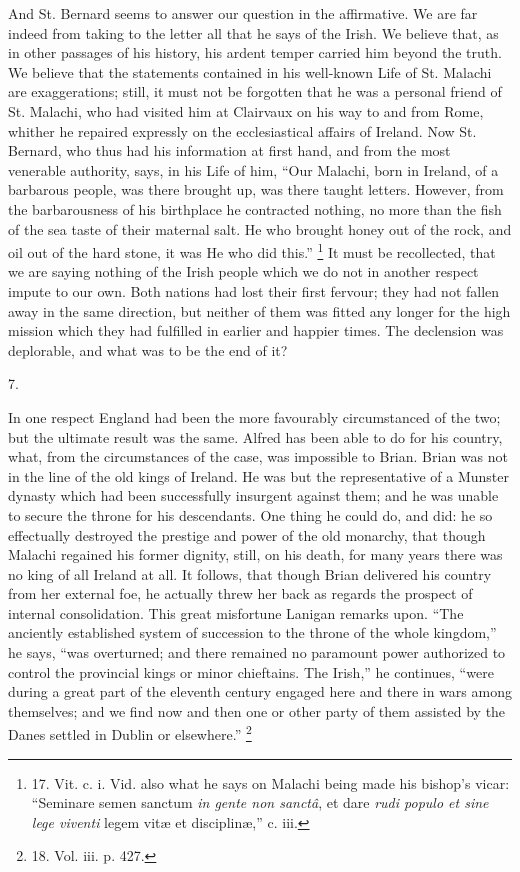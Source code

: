 And St. Bernard seems to
answer our question in the affirmative. We are far indeed from taking
to the letter all that he says of the Irish. We believe that, as in
other passages of his history, his ardent temper carried him beyond
the truth. We believe that the statements contained in his well-known
Life of St. Malachi are exaggerations; still, it must not be forgotten
that he was a personal friend of St. Malachi, who had visited him at
Clairvaux on his way to and from Rome, whither he repaired expressly
on the ecclesiastical affairs of Ireland. Now St. Bernard, who thus
had his information at first hand, and from the most venerable
authority, says, in his Life of him, ``Our Malachi, born in Ireland, of
a barbarous people, was there brought up, was there taught letters.
However, from the barbarousness of his birthplace he contracted
nothing, no more than the fish of the sea taste of their maternal
salt. He who brought honey out of the rock, and oil out of the hard
stone, it was He who did this.'' \footnote{17.
Vit. c. i. Vid. also what he says on Malachi being made his bishop's
vicar: ``Seminare semen sanctum \emph{in gente non sanctâ}, et dare \emph{rudi
populo et sine lege viventi} legem vitæ et disciplinæ,'' c. iii.} It must be recollected, that we are saying nothing of the
Irish people which we do not in another respect impute to our own.
Both nations had lost their first fervour; they had not fallen
away in the same direction, but neither of them was fitted any longer
for the high mission which they had fulfilled in earlier and happier
times. The declension was deplorable, and what was to be the end of
it?

7.

In one respect England had
been the more favourably circumstanced of the two; but the ultimate
result was the same. Alfred has been able to do for his country, what,
from the circumstances of the case, was impossible to Brian. Brian was
not in the line of the old kings of Ireland. He was but the
representative of a Munster dynasty which had been successfully
insurgent against them; and he was unable to secure the throne for his
descendants. One thing he could do, and did: he so effectually
destroyed the prestige and power of the old monarchy, that though
Malachi regained his former dignity, still, on his death, for many
years there was no king of all Ireland at all. It follows, that though
Brian delivered his country from her external foe, he actually threw
her back as regards the prospect of internal consolidation. This great
misfortune Lanigan remarks upon. ``The anciently established system of
succession to the throne of the whole kingdom,'' he says, ``was
overturned; and there remained no paramount power authorized to
control the provincial kings or minor chieftains. The Irish,'' he
continues, ``were during a great part of the eleventh century engaged
here and there in wars among themselves; and we find now and then one
or other party of them assisted by the Danes settled in Dublin or
elsewhere.'' \footnote{18.
Vol. iii. p. 427.}

